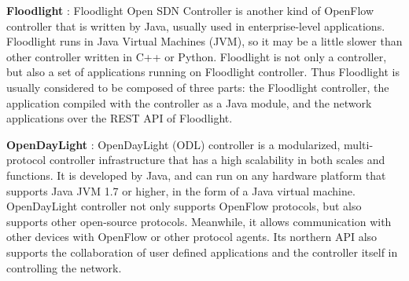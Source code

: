 \textbf{Floodlight} : Floodlight Open SDN Controller is another kind of OpenFlow controller that is written by Java, usually used in enterprise-level applications. Floodlight runs in Java Virtual Machines (JVM), so it may be a little slower than other controller written in C++ or Python. Floodlight is not only a controller, but also a set of applications running on Floodlight controller. Thus Floodlight is usually considered to be composed of three parts: the Floodlight controller, the application compiled with the controller as a Java module, and the network applications over the REST API of Floodlight.

\textbf{OpenDayLight} : OpenDayLight (ODL) controller is a modularized, multi-protocol controller infrastructure that has a high scalability in both scales and functions. It is developed by Java, and can run on any hardware platform that supports Java JVM 1.7 or higher, in the form of a Java virtual machine. OpenDayLight controller not only supports OpenFlow protocols, but also supports other open-source protocols. Meanwhile, it allows communication with other devices with OpenFlow or other protocol agents. Its northern API also supports the collaboration of user defined applications and the controller itself in controlling the network.
